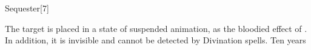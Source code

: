 \begin{spellsection}{Sequester}[7]
    \begin{spellheader}
    \end{spellheader}
    \begin{spellcontent}
        \begin{spelltargetinginfo}
        \end{spelltargetinginfo}
        \begin{spelleffects}

            \spelleffect The target is placed in a state of suspended animation, as the bloodied effect of . In addition, it is invisible and cannot be detected by Divination spells.
            \spelldur Ten years
        \end{spelleffects}
    \end{spellcontent}
    \begin{spellfooter}
    \end{spellfooter}
\end{spellsection}

